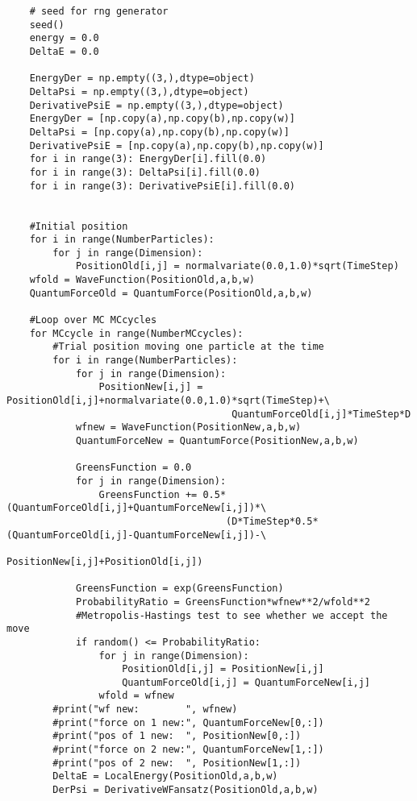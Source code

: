 \documentclass[%
oneside,                 %
final,                   %
10pt]{article}
\begin{document}
\begin{verbatim}
    # seed for rng generator 
    seed()
    energy = 0.0
    DeltaE = 0.0

    EnergyDer = np.empty((3,),dtype=object)
    DeltaPsi = np.empty((3,),dtype=object)
    DerivativePsiE = np.empty((3,),dtype=object)
    EnergyDer = [np.copy(a),np.copy(b),np.copy(w)]
    DeltaPsi = [np.copy(a),np.copy(b),np.copy(w)]
    DerivativePsiE = [np.copy(a),np.copy(b),np.copy(w)]
    for i in range(3): EnergyDer[i].fill(0.0)
    for i in range(3): DeltaPsi[i].fill(0.0)
    for i in range(3): DerivativePsiE[i].fill(0.0)

    
    #Initial position
    for i in range(NumberParticles):
        for j in range(Dimension):
            PositionOld[i,j] = normalvariate(0.0,1.0)*sqrt(TimeStep)
    wfold = WaveFunction(PositionOld,a,b,w)
    QuantumForceOld = QuantumForce(PositionOld,a,b,w)

    #Loop over MC MCcycles
    for MCcycle in range(NumberMCcycles):
        #Trial position moving one particle at the time
        for i in range(NumberParticles):
            for j in range(Dimension):
                PositionNew[i,j] = PositionOld[i,j]+normalvariate(0.0,1.0)*sqrt(TimeStep)+\
                                       QuantumForceOld[i,j]*TimeStep*D
            wfnew = WaveFunction(PositionNew,a,b,w)
            QuantumForceNew = QuantumForce(PositionNew,a,b,w)
            
            GreensFunction = 0.0
            for j in range(Dimension):
                GreensFunction += 0.5*(QuantumForceOld[i,j]+QuantumForceNew[i,j])*\
                                      (D*TimeStep*0.5*(QuantumForceOld[i,j]-QuantumForceNew[i,j])-\
                                      PositionNew[i,j]+PositionOld[i,j])
      
            GreensFunction = exp(GreensFunction)
            ProbabilityRatio = GreensFunction*wfnew**2/wfold**2
            #Metropolis-Hastings test to see whether we accept the move
            if random() <= ProbabilityRatio:
                for j in range(Dimension):
                    PositionOld[i,j] = PositionNew[i,j]
                    QuantumForceOld[i,j] = QuantumForceNew[i,j]
                wfold = wfnew
        #print("wf new:        ", wfnew)
        #print("force on 1 new:", QuantumForceNew[0,:])
        #print("pos of 1 new:  ", PositionNew[0,:])
        #print("force on 2 new:", QuantumForceNew[1,:])
        #print("pos of 2 new:  ", PositionNew[1,:])
        DeltaE = LocalEnergy(PositionOld,a,b,w)
        DerPsi = DerivativeWFansatz(PositionOld,a,b,w)
        

\end{verbatim}
\end{document}
